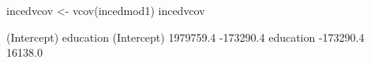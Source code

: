 \begin{Schunk}
\begin{Sinput}
 incedvcov <- vcov(incedmod1)
 incedvcov
\end{Sinput}
\begin{Soutput}
            (Intercept) education
(Intercept)   1979759.4 -173290.4
education     -173290.4   16138.0
\end{Soutput}
\end{Schunk}
